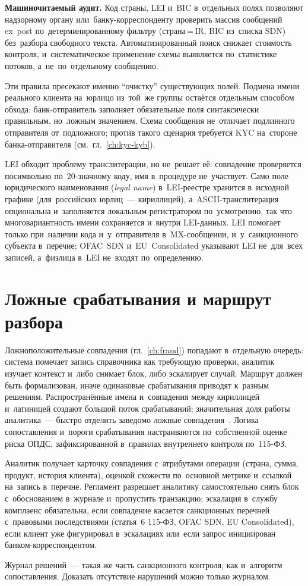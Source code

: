 \textbf{Машиночитаемый аудит.} Код страны, LEI и~BIC в~отдельных полях позволяют
надзорному органу или~банку-корреспонденту проверить массив сообщений ex~post
по~детерминированному фильтру (страна\,=\,IR, BIC из~списка SDN) без~разбора
свободного текста. Автоматизированный поиск снижает стоимость контроля,
и~систематическое применение схемы выявляется по~статистике потоков, а~не~по~отдельному сообщению.

Эти правила пресекают именно \enquote{очистку} существующих полей. Подмена
имени реального клиента на~юрлицо из~той~же группы остаётся
отдельным способом обхода: банк-отправитель заполняет обязательные поля синтаксически
правильным, но~ложным значением. Схема сообщения не~отличает подлинного отправителя
от~подложного; против такого сценария требуется KYC
на~стороне банка-отправителя (см.~гл.~\ref{ch:kyc-kyb}).

LEI обходит проблему транслитерации, но не~решает её: совпадение
проверяется посимвольно по~20-значному коду, имя в~процедуре
не~участвует. Само поле юридического наименования (\textit{legal name}) в~LEI-реестре хранится
в~исходной графике (для~российских юрлиц~--- кириллицей),
а~ASCII-транслитерация опциональна и~заполняется локальным регистратором
по~усмотрению, так что многовариантность имени сохраняется и~внутри
LEI-данных. LEI помогает только при~наличии кода и~у~отправителя
в~MX-сообщении, и~у~санкционного субъекта в~перечне; OFAC~SDN
и~EU~Consolidated указывают LEI не~для~всех записей, а~физлица
в~LEI не~входят по~определению.

\section{Ложные срабатывания и маршрут разбора}\label{sec:sanctions-false-positives}

Ложноположительные совпадения (гл.~\ref{ch:fraud}) попадают в~отдельную
очередь: система помечает запись справочника как требующую проверки, аналитик
изучает контекст и~либо снимает блок, либо эскалирует случай. Маршрут должен
быть формализован, иначе одинаковые срабатывания приводят к~разным решениям.
Распространённые имена и~совпадения между кириллицей и~латиницей создают большой
поток срабатываний; значительная доля работы аналитика~--- быстро отделить заведомо ложные
совпадения~\cite{ofac-sanctions-faq}. Логика сопоставления и~пороги
срабатывания настраиваются по~собственной оценке риска ОПДС,
зафиксированной в~правилах внутреннего контроля по~115-ФЗ.

Аналитик получает карточку совпадения с~атрибутами операции (страна, сумма,
продукт, история клиента), оценкой схожести по~основной метрике и~ссылкой
на~запись в~перечне. Регламент разрешает аналитику самостоятельно снять блок
с~обоснованием в~журнале и~пропустить транзакцию; эскалация в~службу комплаенс
обязательна, если совпадение касается санкционных перечней с~правовыми последствиями
(статья~6 115-ФЗ, OFAC SDN, EU Consolidated), если клиент уже фигурировал
в~эскалациях или~если запрос инициирован банком-корреспондентом.

Журнал решений~--- такая же часть санкционного контроля, как и~алгоритм
сопоставления. Доказать отсутствие нарушений можно только журналом.
